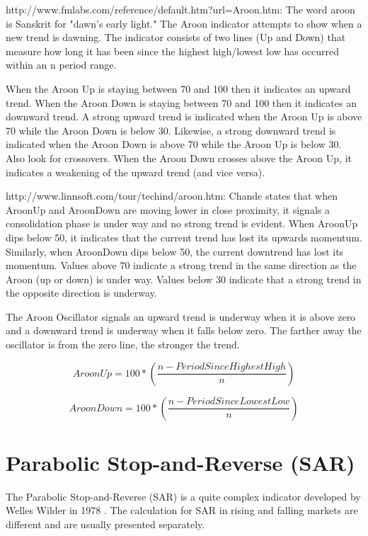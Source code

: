http://www.fmlabs.com/reference/default.htm?url=Aroon.htm:
The word aroon is Sanskrit for "dawn's early light." The Aroon indicator attempts to show when a new trend is dawning. The indicator consists of two lines (Up and Down) that measure how long it has been since the highest high/lowest low has occurred within an n period range.

When the Aroon Up is staying between 70 and 100 then it indicates an upward trend. When the Aroon Down is staying between 70 and 100 then it indicates an downward trend. A strong upward trend is indicated when the Aroon Up is above 70 while the Aroon Down is below 30. Likewise, a strong downward trend is indicated when the Aroon Down is above 70 while the Aroon Up is below 30. Also look for crossovers. When the Aroon Down crosses above the Aroon Up, it indicates a weakening of the upward trend (and vice versa).

http://www.linnsoft.com/tour/techind/aroon.htm:
Chande states that when AroonUp and AroonDown are moving lower in close proximity, it signals a consolidation phase is under way and no strong trend is evident. When AroonUp dips below 50, it indicates that the current trend has lost its upwards momentum. Similarly, when AroonDown dips below 50, the current downtrend has lost its momentum. Values above 70 indicate a strong trend in the same direction as the Aroon (up or down) is under way. Values below 30 indicate that a strong trend in the opposite direction is underway.

The Aroon Oscillator signals an upward trend is underway when it is above zero and a downward trend is underway when it falls below zero. The farther away the oscillator is from the zero line, the stronger the trend.


\[ Aroon Up = 100 * \left( \dfrac{n - PeriodSinceHighestHigh}{n} \right) \]

\[ Aroon Down = 100 * \left( \dfrac{n - PeriodSinceLowestLow}{n} \right) \]


\section{Parabolic Stop-and-Reverse (SAR)}
\label{appB:sar}
The Parabolic Stop-and-Reverse (SAR) is a quite complex indicator developed by Welles Wilder in 1978 \citep{wilder1978new}. The calculation for SAR in rising and falling markets are different and are usually presented separately.

